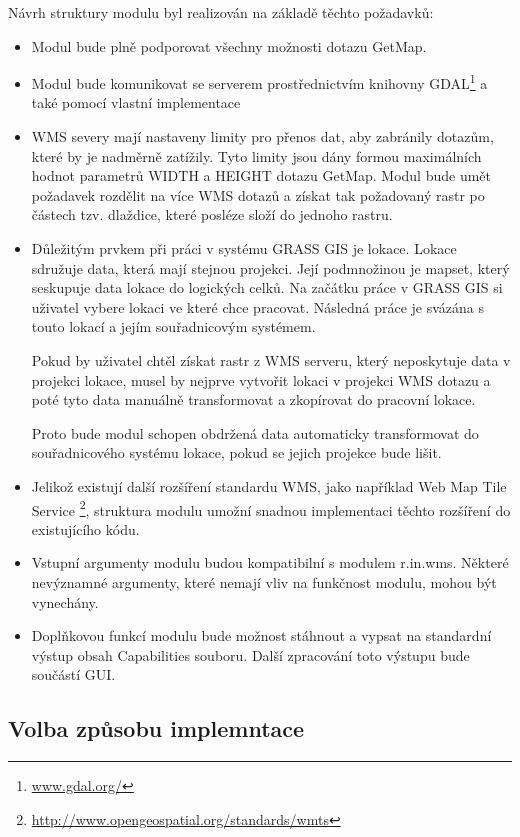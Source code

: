 \documentclass[a4paper,12pt]{article}
\begin{document}
Návrh struktury modulu byl realizován na základě těchto požadavků:
\begin{itemize}
  \item Modul bude plně podporovat všechny možnosti dotazu GetMap.
  \item Modul bude komunikovat se serverem prostřednictvím knihovny
    GDAL\footnote{\url{www.gdal.org/}} a také pomocí vlastní
    implementace
  \item WMS severy mají nastaveny limity pro přenos dat, aby zabránily
    dotazům, které by je nadměrně zatížily. Tyto limity jsou dány
    formou maximálních hodnot parametrů WIDTH a HEIGHT dotazu GetMap.
    Modul bude umět požadavek rozdělit na více WMS dotazů a získat tak
    požadovaný rastr po částech tzv. dlaždice, které posléze složí do
    jednoho rastru.
  \item Důležitým prvkem při práci v systému GRASS GIS je
    lokace. Lokace sdružuje data, která mají stejnou projekci. Její
    podmnožinou je mapset, který seskupuje data lokace do logických
    celků.  Na začátku práce v GRASS GIS si uživatel vybere lokaci ve
    které chce pracovat. Následná práce je svázána s touto lokací a
    jejím souřadnicovým systémem.
 
    Pokud by uživatel chtěl získat rastr z WMS serveru, který
    neposkytuje data v projekci lokace, musel by nejprve vytvořit
    lokaci v projekci WMS dotazu a poté tyto data manuálně
    transformovat a zkopírovat do pracovní lokace.
    
    Proto bude modul schopen obdržená data automaticky transformovat
    do souřadnicového systému lokace, pokud se jejich projekce bude
    lišit.
  \item Jelikož existují další rozšíření standardu WMS, jako například
    Web Map Tile
    Service \footnote{\url{http://www.opengeospatial.org/standards/wmts}},
    struktura modulu umožní snadnou implementaci těchto rozšíření do
    existujícího kódu.
  \item Vstupní argumenty modulu budou kompatibilní s modulem
    r.in.wms. Některé nevýznamné argumenty, které nemají vliv na
    funkčnost modulu, mohou být vynechány.
  \item Doplňkovou funkcí modulu bude možnost stáhnout a vypsat na
    standardní výstup obsah Capabilities souboru. Další zpracování
    toto výstupu bude součástí GUI.
 \end{itemize}



\subsection{Volba způsobu implemntace}
\end{document}
